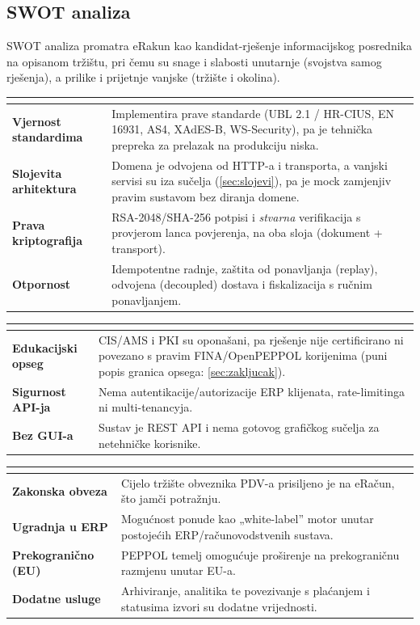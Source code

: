 \documentclass[11pt,a4paper]{article}
\begin{document}
\subsection{SWOT analiza}

SWOT analiza promatra eRakun kao kandidat-rješenje informacijskog posrednika na
opisanom tržištu, pri čemu su snage i slabosti unutarnje (svojstva samog rješenja), a prilike i
prijetnje vanjske (tržište i okolina).

\renewcommand{\arraystretch}{1.15}
\begin{tabularx}{\textwidth}{@{}>{\bfseries}l Y@{}}
\toprule
{} \\
\midrule
Vjernost standardima & Implementira prave standarde (UBL 2.1 / HR-CIUS, EN 16931, AS4, XAdES-B, WS-Security), pa je tehnička prepreka za prelazak na produkciju niska. \\
Slojevita arhitektura & Domena je odvojena od HTTP-a i transporta, a vanjski servisi su iza sučelja (\ref{sec:slojevi}), pa je mock zamjenjiv pravim sustavom bez diranja domene. \\
Prava kriptografija & RSA-2048/SHA-256 potpisi i \emph{stvarna} verifikacija s provjerom lanca povjerenja, na oba sloja (dokument + transport). \\
Otpornost & Idempotentne radnje, zaštita od ponavljanja (replay), odvojena (decoupled) dostava i fiskalizacija s ručnim ponavljanjem. \\
\bottomrule
\end{tabularx}

\begin{tabularx}{\textwidth}{@{}>{\bfseries}l Y@{}}
\toprule
{} \\
\midrule
Edukacijski opseg & CIS/AMS i PKI su oponašani, pa rješenje nije certificirano ni povezano s pravim FINA/OpenPEPPOL korijenima (puni popis granica opsega: \ref{sec:zakljucak}). \\
Sigurnost API-ja & Nema autentikacije/autorizacije ERP klijenata, rate-limitinga ni multi-tenancyja. \\
Bez GUI-a & Sustav je REST API i nema gotovog grafičkog sučelja za netehničke korisnike. \\
\bottomrule
\end{tabularx}

\begin{tabularx}{\textwidth}{@{}>{\bfseries}l Y@{}}
\toprule
{} \\
\midrule
Zakonska obveza & Cijelo tržište obveznika PDV-a prisiljeno je na eRačun, što jamči potražnju. \\
Ugradnja u ERP & Mogućnost ponude kao „white-label” motor unutar postojećih ERP/računovodstvenih sustava. \\
Prekogranično (EU) & PEPPOL temelj omogućuje proširenje na prekograničnu razmjenu unutar EU-a. \\
Dodatne usluge & Arhiviranje, analitika te povezivanje s plaćanjem i statusima izvori su dodatne vrijednosti. \\
\bottomrule
\end{tabularx}
\end{document}
